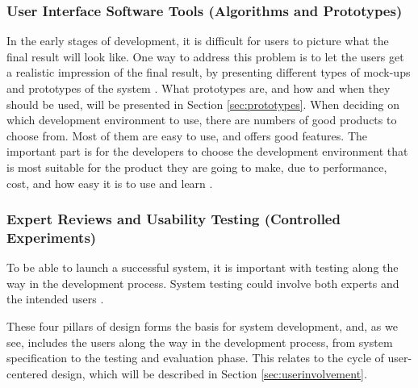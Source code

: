 \subsubsection{User Interface Software Tools (Algorithms and Prototypes)}
In the early stages of development, it is difficult for users to picture what the final result will look like. One way to address this problem is to let the users get a realistic impression of the final result, by presenting different types of mock-ups and prototypes of the system \cite{mmi}. What prototypes are, and how and when they should be used, will be presented in Section \ref{sec:prototypes}. When deciding on which development environment to use, there are numbers of good products to choose from. Most of them are easy to use, and offers good features. The important part is for the developers to choose the development environment that is most suitable for the product they are going to make, due to performance, cost, and how easy it is to use and learn \cite{mmi}.
	
\subsubsection{Expert Reviews and Usability Testing (Controlled Experiments)}
To be able to launch a successful system, it is important with testing along the way in the development process. System testing could involve both experts and the intended users \cite{mmi}. 

These four pillars of design forms the basis for system development, and, as we see, includes the users along the way in the development process, from system specification to the testing and evaluation phase. This relates to the cycle of user-centered design, which will be described in Section \ref{sec:userinvolvement}.     

